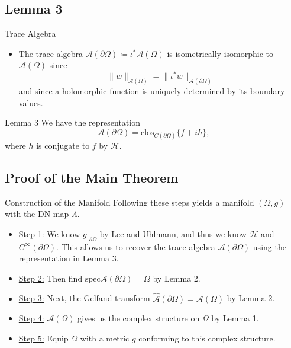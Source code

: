 \documentclass[aspectratio=169]{beamer}
\newcommand{\hilbert}{\mathcal{H}}
\newcommand{\algebra}{\mathcal{A}}
\newcommand{\spec}{\mathrm{spec}}
\begin{document}
\subsection{Lemma 3}

\begin{frame}{Trace Algebra}
\vfill
    \begin{itemize}
        \pause
        \item The trace algebra $\algebra (\partial \Omega) \coloneqq \iota^* \algebra(\Omega)$ is isometrically isomorphic to $\algebra(\Omega)$ since
        \[
        \|w\|_{\algebra(\Omega)} = \|\iota^* w \|_{\algebra(\partial \Omega)}
        \]
        and since a holomorphic function is uniquely determined by its boundary values.
    \end{itemize}
\vfill
\end{frame}

\begin{frame}{Lemma 3}
\vfill
    We have the representation
    \[
    \algebra(\partial \Omega) = \mathrm{clos}_{C(\partial \Omega)} \{ f +i h\},
    \]
    where $h$ is conjugate to $f$ by $\hilbert$.
\vfill
\end{frame}

\subsection{Proof of the Main Theorem}


\begin{frame}{Construction of the Manifold}
\vfill
\pause
Following these steps yields a manifold $(\Omega, g)$ with the DN map $\Lambda$.
    \begin{itemize}
        \pause
        \item \underline{Step 1:} We know $g|_{\partial \Omega}$ by Lee and Uhlmann, and thus we know $\hilbert$ and $C^\infty(\partial \Omega)$.  This allows us to recover the trace algebra $\algebra(\partial \Omega)$ using the representation in Lemma 3.
        
        \pause
        \item \underline{Step 2:} Then find $\spec \algebra(\partial \Omega)=\Omega$ by Lemma 2.
        
        \pause 
        \item \underline{Step 3:} Next, the Gelfand transform $\hat{\algebra}(\partial \Omega)=\algebra(\Omega)$ by Lemma 2.
        
        \pause
        \item \underline{Step 4:} $\algebra(\Omega)$ gives us the complex structure on $\Omega$ by Lemma 1.
        
        \pause
        \item \underline{Step 5:} Equip $\Omega$ with a metric $g$ conforming to this complex structure.
    \end{itemize}
\vfill
\end{frame}
\end{document}
